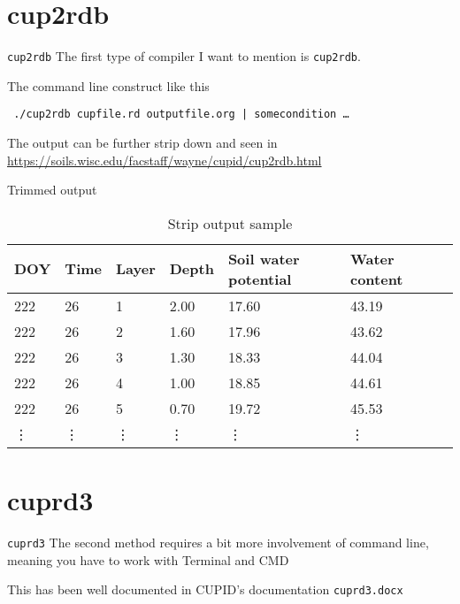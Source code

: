 \documentclass{beamer}
\begin{document}
\section{cup2rdb}
	\begin{frame}{\texttt{cup2rdb}}
		The first type of compiler I want to mention is \texttt{cup2rdb}. 
		
		The command line construct like this
		
		\texttt{
		./cup2rdb cupfile.rd outputfile.org | somecondition \ldots
		}
		
		The output can be further strip down and seen in \url{https://soils.wisc.edu/facstaff/wayne/cupid/cup2rdb.html}
	\end{frame}
	
	\begin{frame}{Trimmed output}
			\begin{table}[h]
			\begin{tabular}{lllllll}
DOY    & Time     & Layer    & Depth  & Soil water potential & Water content \\
\hline
222    & 26     & 1      & 2.00   & 17.60          & 43.19         \\
222    & 26     & 2      & 1.60   & 17.96          & 43.62         \\
222    & 26     & 3      & 1.30   & 18.33          & 44.04         \\
222    & 26     & 4      & 1.00   & 18.85          & 44.61         \\
222    & 26     & 5      & 0.70   & 19.72          & 45.53         \\
\vdots    & \vdots & \vdots & \vdots & \vdots & \vdots         
		\end{tabular}
		\caption{Strip output sample}
		\end{table}
	\end{frame}
	
\section{cuprd3}
	\begin{frame}{\texttt{cuprd3}}
	The second method requires a bit more involvement of command line, meaning you have to work with Terminal and CMD
	
	This has been well documented in CUPID's documentation \texttt{cuprd3.docx}
	
	\end{frame}
\end{document}
